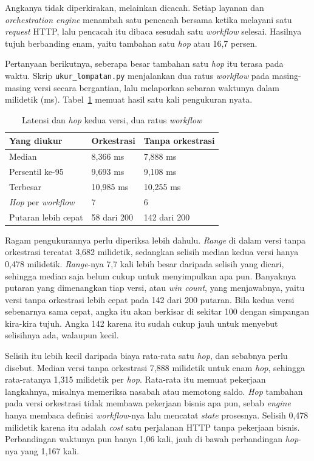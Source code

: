 Angkanya tidak diperkirakan, melainkan dicacah. Setiap layanan dan
\textit{orchestration engine} menambah satu pencacah bersama ketika melayani
satu \textit{request} HTTP, lalu pencacah itu dibaca sesudah satu
\textit{workflow} selesai. Hasilnya tujuh berbanding enam, yaitu tambahan satu
\textit{hop} atau 16,7 persen.

Pertanyaan berikutnya, seberapa besar tambahan satu \textit{hop} itu terasa pada
waktu. Skrip \texttt{ukur\_lompatan.py} menjalankan dua ratus \textit{workflow} pada
masing-masing versi secara bergantian, lalu melaporkan sebaran waktunya
dalam milidetik (ms).
Tabel~\ref{tab:latensi-odsoa} memuat hasil satu kali pengukuran nyata.

\begin{table}[htbp]
  \centering
  \caption{Latensi dan \textit{hop} kedua versi, dua ratus \textit{workflow}}
  \label{tab:latensi-odsoa}
  \begin{tabularx}{\textwidth}{|X|l|l|}
    \hline
    \textbf{Yang diukur} & \textbf{Orkestrasi} & \textbf{Tanpa orkestrasi} \\
    \hline
    Median & 8,366 ms & 7,888 ms \\
    \hline
    Persentil ke-95 & 9,693 ms & 9,108 ms \\
    \hline
    Terbesar & 10,985 ms & 10,255 ms \\
    \hline
    \textit{Hop} per \textit{workflow} & 7 & 6 \\
    \hline
    Putaran lebih cepat & 58 dari 200 & 142 dari 200 \\
    \hline
  \end{tabularx}
\end{table}

Ragam pengukurannya perlu diperiksa lebih dahulu.
\textit{Range} di dalam versi
tanpa orkestrasi tercatat 3,682 milidetik, sedangkan selisih median kedua
versi
hanya 0,478 milidetik. \textit{Range}-nya 7,7 kali lebih besar daripada selisih
yang dicari, sehingga median saja belum cukup untuk menyimpulkan apa pun.
Banyaknya putaran yang dimenangkan tiap versi, atau \textit{win
count}, yang menjawabnya, yaitu versi
tanpa orkestrasi lebih cepat pada 142 dari 200 putaran. Bila kedua versi sebenarnya sama cepat, angka
itu akan berkisar di sekitar 100 dengan simpangan kira-kira tujuh. Angka 142
karena itu sudah cukup jauh untuk menyebut selisihnya ada, walaupun kecil.

Selisih itu lebih kecil daripada biaya rata-rata satu \textit{hop}, dan sebabnya
perlu disebut. Median versi tanpa orkestrasi 7,888 milidetik untuk enam
\textit{hop}, sehingga rata-ratanya 1,315 milidetik per \textit{hop}. Rata-rata
itu memuat pekerjaan langkahnya, misalnya memeriksa nasabah atau memotong
saldo. \textit{Hop} tambahan pada versi orkestrasi tidak membawa pekerjaan bisnis
apa pun, sebab \textit{engine} hanya membaca definisi \textit{workflow}-nya lalu mencatat \textit{state}
prosesnya. Selisih 0,478 milidetik karena itu adalah \textit{cost} satu perjalanan HTTP
tanpa pekerjaan bisnis. Perbandingan waktunya pun hanya 1,06 kali, jauh di
bawah perbandingan \textit{hop}-nya yang 1,167 kali.

